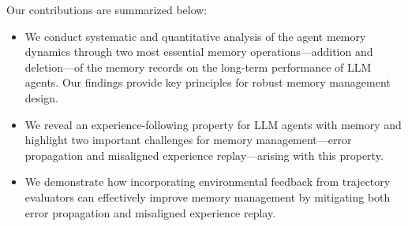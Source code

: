 \documentclass[11pt]{article}
\theoremstyle{plain}
\theoremstyle{definition}
\newcommand{\zhen}[1]{\textcolor{blue}{[Zhen: #1]}}
\begin{document}
Our contributions are summarized below:

\begin{itemize}[leftmargin=*]
\vspace{-0.1in}
\setlength\itemsep{0em}
\item {We conduct systematic and quantitative analysis of the agent memory dynamics through two most essential memory operations—addition and deletion—of the memory records on the long-term performance of LLM agents.
Our findings provide key principles for robust memory management design.}
\item We reveal an experience-following property for LLM agents with memory and highlight two important challenges for memory management—error propagation and misaligned experience replay—arising with this property. 
\item {
We demonstrate how incorporating environmental feedback from trajectory evaluators can effectively improve memory management by mitigating both error propagation and misaligned experience replay.
}

\end{itemize}
\end{document}
